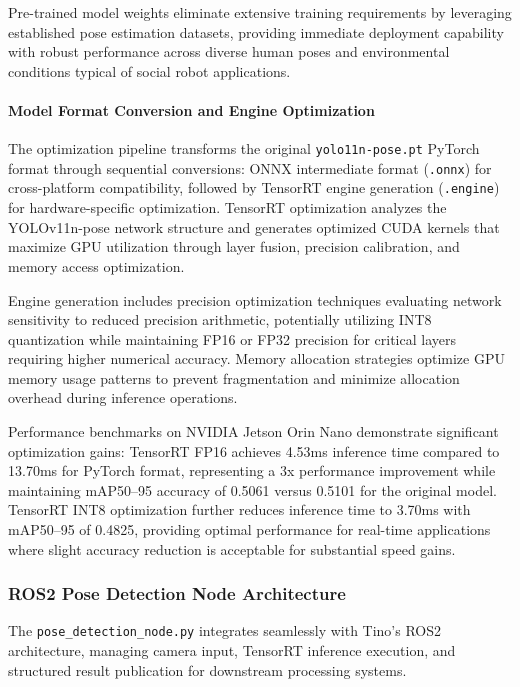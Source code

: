 Pre-trained model weights eliminate extensive training requirements by leveraging established pose estimation datasets, providing immediate deployment capability with robust performance across diverse human poses and environmental conditions typical of social robot applications.

\paragraph{Model Format Conversion and Engine Optimization}

The optimization pipeline transforms the original \texttt{yolo11n-pose.pt} PyTorch format through sequential conversions: ONNX intermediate format (\texttt{.onnx}) for cross-platform compatibility, followed by TensorRT engine generation (\texttt{.engine}) for hardware-specific optimization. TensorRT optimization analyzes the YOLOv11n-pose network structure and generates optimized CUDA kernels that maximize GPU utilization through layer fusion, precision calibration, and memory access optimization.

Engine generation includes precision optimization techniques evaluating network sensitivity to reduced precision arithmetic, potentially utilizing INT8 quantization while maintaining FP16 or FP32 precision for critical layers requiring higher numerical accuracy. Memory allocation strategies optimize GPU memory usage patterns to prevent fragmentation and minimize allocation overhead during inference operations.

Performance benchmarks on NVIDIA Jetson Orin Nano demonstrate significant optimization gains: TensorRT FP16 achieves 4.53ms inference time compared to 13.70ms for PyTorch format, representing a 3x performance improvement while maintaining mAP50--95 accuracy of 0.5061 versus 0.5101 for the original model. TensorRT INT8 optimization further reduces inference time to 3.70ms with mAP50--95 of 0.4825, providing optimal performance for real-time applications where slight accuracy reduction is acceptable for substantial speed gains.

\subsubsection{ROS2 Pose Detection Node Architecture}

The \texttt{pose\_detection\_node.py} integrates seamlessly with Tino's ROS2 architecture, managing camera input, TensorRT inference execution, and structured result publication for downstream processing systems.

